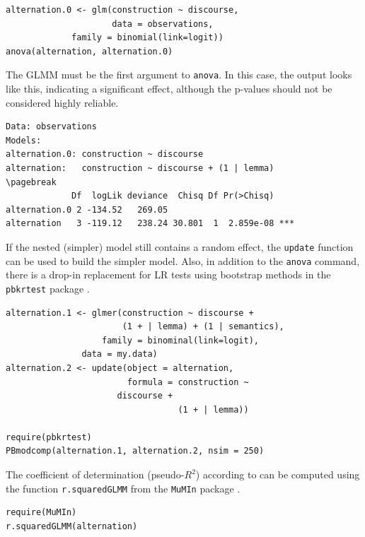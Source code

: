 \documentclass[a4paper,12pt]{article}
\begin{document}
\begin{lstlisting}
alternation.0 <- glm(construction ~ discourse,
                     data = observations,
		     family = binomial(link=logit))
anova(alternation, alternation.0)
\end{lstlisting}

The GLMM must be the first argument to \texttt{anova}.
In this case, the output looks like this, indicating a significant effect, although the p-values should not be considered highly reliable.

\vspace{0.5\baselineskip}

\begin{lstlisting}
Data: observations
Models:
alternation.0: construction ~ discourse
alternation:   construction ~ discourse + (1 | lemma)
\pagebreak
             Df  logLik deviance  Chisq Df Pr(>Chisq)    
alternation.0 2 -134.52   269.05                         
alternation   3 -119.12   238.24 30.801  1  2.859e-08 ***
\end{lstlisting}

If the nested (simpler) model still contains a random effect, the \texttt{update} function can be used to build the simpler model.
Also, in addition to the \texttt{anova} command, there is a drop-in replacement for LR tests using bootstrap methods in the \texttt{pbkrtest} package \citep{HalekohHojsgaard2014}.

\vspace{0.5\baselineskip}

\begin{lstlisting}
alternation.1 <- glmer(construction ~ discourse +
                       (1 + | lemma) + (1 | semantics),
	               family = binominal(link=logit),
		       data = my.data)
alternation.2 <- update(object = alternation,
                        formula = construction ~
			          discourse +
                                  (1 + | lemma))

require(pbkrtest)
PBmodcomp(alternation.1, alternation.2, nsim = 250)
\end{lstlisting}

The coefficient of determination (pseudo-$R^2$) according to \citet{NakagawaSchielzeth2013} can be computed using the function \texttt{r.squaredGLMM} from the \texttt{MuMIn} package \citep{Barton2016}.

\vspace{0.5\baselineskip}

\begin{lstlisting}
require(MuMIn)
r.squaredGLMM(alternation)
\end{lstlisting}
\end{document}
